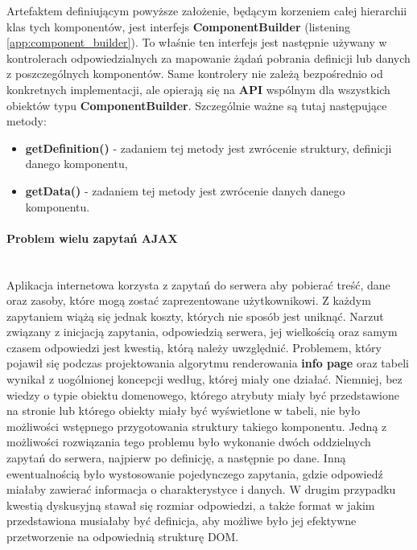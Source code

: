 	Artefaktem definiującym powyższe założenie, będącym korzeniem całej hierarchii klas tych komponentów, jest interfejs \textbf{ComponentBuilder} (listening \ref{app:component_builder}). To właśnie ten interfejs jest następnie używany w kontrolerach odpowiedzialnych za mapowanie żądań pobrania definicji lub danych z poszczególnych komponentów. Same kontrolery nie zależą bezpośrednio od konkretnych implementacji, ale opierają się na \textbf{API} wspólnym dla wszystkich obiektów typu \textbf{ComponentBuilder}. Szczególnie ważne są tutaj następujące metody:
	\begin{itemize}
		\item \textbf{getDefinition()} - zadaniem tej metody jest zwrócenie struktury, definicji danego komponentu,
		\item \textbf{getData()} - zadaniem tej metody jest zwrócenie danych danego komponentu.
	\end{itemize}
	
	
	\paragraph{Problem wielu zapytań AJAX} \hspace{0pt} \\
	Aplikacja internetowa korzysta z zapytań do serwera aby pobierać treść, dane oraz zasoby, które mogą zostać zaprezentowane użytkownikowi. Z każdym zapytaniem wiążą się jednak koszty, których nie sposób jest uniknąć. Narzut związany z inicjacją zapytania, odpowiedzią serwera, jej wielkością oraz samym czasem odpowiedzi jest kwestią, którą należy uwzględnić. Problemem, który pojawił się podczas projektowania algorytmu renderowania \textbf{info page} oraz tabeli wynikał z uogólnionej koncepcji według, której miały one działać. Niemniej, bez wiedzy o typie obiektu domenowego, którego atrybuty miały być przedstawione na stronie lub którego obiekty miały być wyświetlone w tabeli, nie było możliwości wstępnego przygotowania struktury takiego komponentu. Jedną z możliwości rozwiązania tego problemu było wykonanie dwóch oddzielnych zapytań do serwera, najpierw po definicję, a następnie po dane. Inną ewentualnością było wystosowanie pojedynczego zapytania, gdzie odpowiedź miałaby zawierać informacja o charakterystyce i danych. W drugim przypadku kwestią dyskusyjną stawał się rozmiar odpowiedzi, a także format w jakim przedstawiona musiałaby być definicja, aby możliwe było jej efektywne przetworzenie na odpowiednią strukturę DOM.  
	
